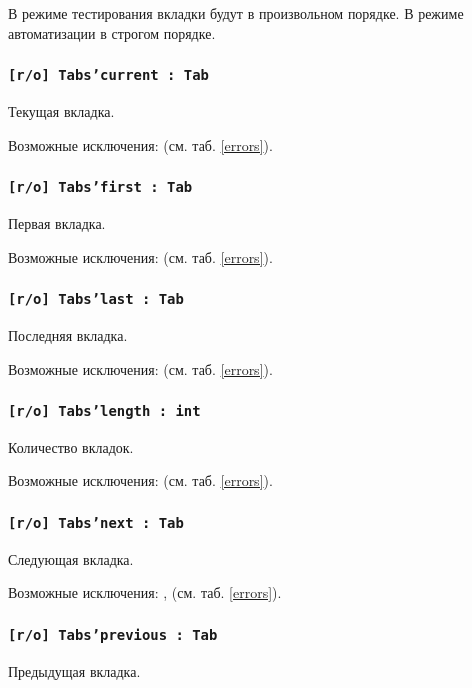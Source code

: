 В режиме тестирования вкладки будут в произвольном порядке. В режиме автоматизации в строгом порядке.

\subsubsection{\texttt{[r/o] Tabs'current : Tab}}

Текущая вкладка.

Возможные исключения:  (см. таб. \ref{errors}).

\subsubsection{\texttt{[r/o] Tabs'first : Tab}}

Первая вкладка.

Возможные исключения:  (см. таб. \ref{errors}).

\subsubsection{\texttt{[r/o] Tabs'last : Tab}}

Последняя вкладка.

Возможные исключения:  (см. таб. \ref{errors}).

\subsubsection{\texttt{[r/o] Tabs'length : int}}

Количество вкладок.

Возможные исключения:  (см. таб. \ref{errors}).

\subsubsection{\texttt{[r/o] Tabs'next : Tab}}

Следующая вкладка.

Возможные исключения: ,  (см. таб. \ref{errors}).

\subsubsection{\texttt{[r/o] Tabs'previous : Tab}}

Предыдущая вкладка.

